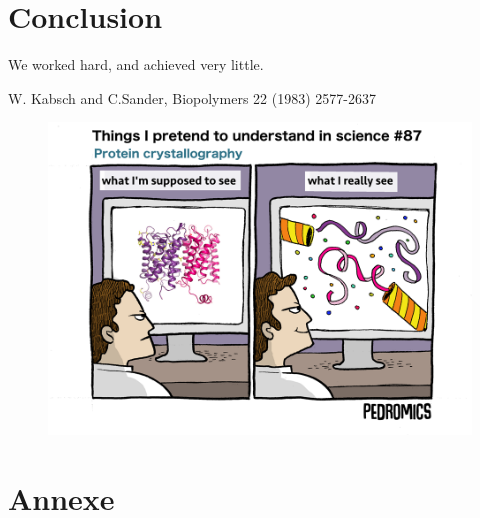 \documentclass[12pt]{article}
\begin{document}
\section{Conclusion}
We worked hard, and achieved very little.
\clearpage


W. Kabsch and C.Sander, Biopolymers 22 (1983) 2577-2637
\\
\begin{figure}[h!]
	\centering
	\includegraphics[totalheight=8cm]{img/pedromics.png}
	\label{fig:verticalcell}
\end{figure}
\clearpage
\section{Annexe}
\end{document}
